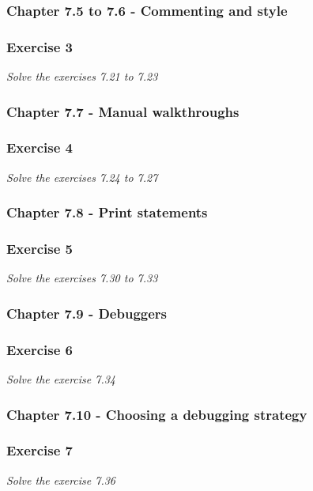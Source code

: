 \subsubsection{Chapter 7.5 to 7.6 - Commenting and style}

\subsubsection*{Exercise 3}
\textit{Solve the exercises 7.21 to 7.23} \\

\subsubsection{Chapter 7.7 - Manual walkthroughs}

\subsubsection*{Exercise 4}
\textit{Solve the exercises 7.24 to 7.27}

\subsubsection{Chapter 7.8 - Print statements}

\subsubsection*{Exercise 5}
\textit{Solve the exercises 7.30 to 7.33} \\


\subsubsection{Chapter 7.9 - Debuggers}

\subsubsection*{Exercise 6}
\textit{Solve the exercise 7.34} \\

\subsubsection{Chapter 7.10 - Choosing a debugging strategy}

\subsubsection*{Exercise 7}
\textit{Solve the exercise 7.36}

